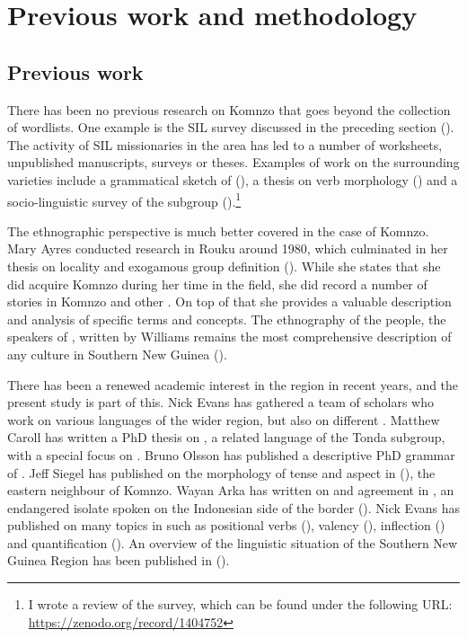 \section{Previous work and methodology}\label{prevmethod}
\largerpage
\subsection{Previous work}\label{previouswork}

There has been no previous research on Komnzo that goes beyond the collection of wordlists. One example is the SIL survey discussed in the preceding section (\citealt{Clifton:1991fly}). The activity of SIL missionaries in the area has led to a number of  worksheets, unpublished manuscripts, surveys or theses. Examples of work on the surrounding varieties include a grammatical sketch of  (\citealt{Bouve:2003ar}), a thesis on  verb morphology (\citealt{Sarsa2001:wa}) and a socio-linguistic survey of the  subgroup (\citealt{Grummit:2012sur}).\footnote{I wrote a review of the survey, which can be found under the following URL: \url{https://zenodo.org/record/1404752}}

The ethnographic perspective is much better covered in the case of Komnzo. Mary Ayres conducted research in Rouku around 1980, which culminated in her thesis on locality and exogamous group definition (\citealt{Ayres:ws}). While she states that she did acquire Komnzo during her time in the field, she did record a number of stories in Komnzo and other . On top of that she provides a valuable description and analysis of specific terms and concepts. The ethnography of the  people, the speakers of , written by Williams remains the most comprehensive description of any culture in Southern New Guinea (\citealt{Williams:1936transfly}).

There has been a renewed academic interest in the region in recent years, and the present study is part of this. Nick Evans has gathered a team of scholars who work on various languages of the wider region, but also on different . Matthew Caroll has written a PhD thesis on , a related language of the Tonda subgroup, with a special focus on  \citep{Carroll:Ngkolmpu}. Bruno Olsson has published a descriptive PhD grammar of  \citep{Olsson:Marind}. Jeff Siegel has published on the morphology of tense and aspect in  (\citealt{Siegel:2015bp}), the eastern neighbour of Komnzo. Wayan Arka has written on  and agreement in , an endangered isolate spoken on the Indonesian side of the border (\citealt{Arka:2012tt}). Nick Evans has published on many topics in  such as positional verbs (\citealt{Evans:2014bz}), valency (\citealt{Evans:2015wy}), inflection (\citealt{Evans:2015to}) and quantification (\citealt{Evans:quant}). An overview of the linguistic situation of the Southern New Guinea Region has been published in (\citealt{Evans:sng}).

